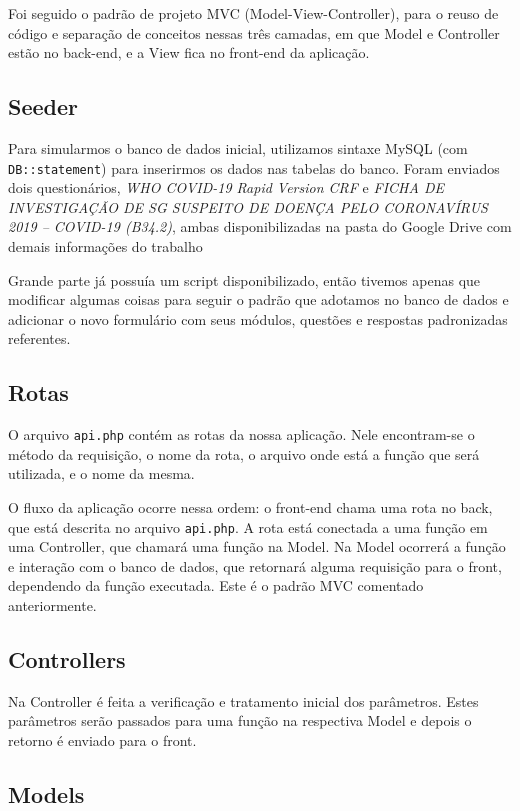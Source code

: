 \documentclass[12pt]{article}
\begin{document}
Foi seguido o padrão de projeto MVC (Model-View-Controller),
para o reuso de código e separação de conceitos
nessas três camadas, em que Model e Controller
estão no back-end, e a View fica
no front-end da aplicação.

\subsection{Seeder}

Para simularmos o banco de dados inicial,
utilizamos sintaxe MySQL (com \texttt{DB::statement})
para inserirmos os dados nas tabelas do banco.
Foram enviados dois questionários,
\textit{WHO COVID-19 Rapid Version CRF} e
\textit{FICHA DE INVESTIGAÇÃO DE SG SUSPEITO
DE DOENÇA PELO CORONAVÍRUS 2019 – COVID-19 (B34.2)},
ambas disponibilizadas na pasta do
Google Drive com demais informações do trabalho

Grande parte já possuía um script disponibilizado,
então tivemos apenas que modificar algumas coisas
para seguir o padrão que adotamos no banco de dados
e adicionar o novo formulário com seus módulos,
questões e respostas padronizadas referentes.

\subsection{Rotas}

O arquivo \texttt{api.php} contém as rotas da nossa aplicação.
Nele encontram-se o método da requisição,
o nome da rota, o arquivo onde está a função
que será utilizada, e o nome da mesma.

O fluxo da aplicação ocorre nessa ordem:
o front-end chama uma rota no back,
que está descrita no arquivo \texttt{api.php}.
A rota está conectada a uma função em uma Controller,
que chamará uma função na Model.
Na Model ocorrerá a função e interação
com o banco de dados, que retornará
alguma requisição para o front,
dependendo da função executada.
Este é o padrão MVC comentado anteriormente.

\subsection{Controllers}

Na Controller é feita a verificação
e tratamento inicial dos parâmetros.
Estes parâmetros serão passados
para uma função na respectiva Model
e depois o retorno é enviado para o front.

\subsection{Models}
\end{document}
